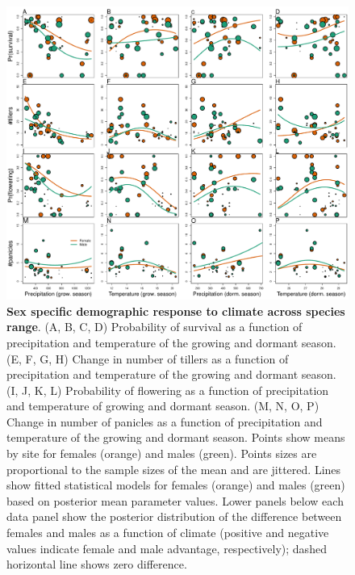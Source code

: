 \documentclass[12pt]{article}\usepackage[]{graphicx}\usepackage[dvipsnames]{xcolor}
\begin{document}
\begin{figure}[H]
	\begin{center}
		\includegraphics[width=0.95\linewidth]{Figures/vital_rates_v1.pdf}
		\caption{\textbf{Sex specific demographic response to climate across species range}.
			(A, B, C, D) Probability of survival as a function of precipitation and temperature of the growing and dormant season.
			(E, F, G, H) Change in number of tillers as a function of precipitation and temperature of the growing and dormant season.
			(I, J, K, L) Probability of flowering as a function of precipitation and temperature of growing and dormant season.
			(M, N, O, P) Change in number of panicles as a function of precipitation and temperature of the growing and dormant season.
			Points show means by site for females (orange) and males (green). 
			Points sizes are proportional to the sample sizes of the mean and are jittered.
			Lines show fitted statistical models for females (orange) and males (green) based on posterior mean parameter values.
			Lower panels below each data panel show the posterior distribution of the difference between females and males as a function of climate (positive and negative values indicate female and male advantage, respectively); dashed horizontal line shows zero difference.
		}
		\label{fig:vital_rates}
	\end{center}
\end{figure}
\end{document}
